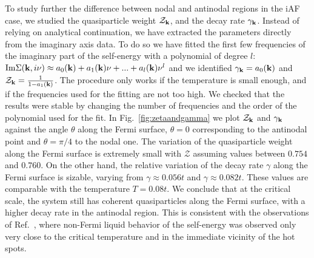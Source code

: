 To study further the difference between nodal and antinodal regions in the iAF case, we studied the quasiparticle weight\cite{Abrikosov1963,Metzner2012} $\mathcal{Z}_{\mathbf{k}}$, and the decay rate $\gamma_{\mathbf{k}}$.
Instead of relying on analytical continuation, we have extracted the parameters directly from the imaginary axis data.
To do so we have fitted the first few frequencies of the imaginary part of the self-energy with a polynomial of degree $l$: $\mathrm{Im}\Sigma(\mathbf{k},i\nu)\approx a_0(\mathbf{k})+a_1(\mathbf{k})\nu+...+a_l(\mathbf{k})\nu^l$ and we identified $\gamma_{\mathbf{k}}=a_0(\mathbf{k})$ and $\mathcal{Z}_{\mathbf{k}}= \frac{1}{1-a_1(\mathbf{k})}$.
The procedure only works if the temperature is small enough, and if the frequencies used for the fitting are not too high. We checked that the results were stable by changing the number of frequencies and the order of the polynomial used for the fit. 
In Fig.~\ref{fig:zetaandgamma} we plot $\mathcal{Z}_{\mathbf{k}}$ and $\gamma_{\mathbf{k}}$ against the angle $\theta$ along the Fermi surface, $\theta=0$ corresponding to the antinodal point and $\theta=\pi/4$ to the nodal one. 
The variation of the quasiparticle weight along the Fermi surface is extremely small with $\mathcal{Z}$ assuming values between $0.754$ and $0.760$. 
On the other hand, the relative variation of the decay rate $\gamma$ along the Fermi surface is sizable, varying from $\gamma\approx 0.056t$ and $\gamma \approx 0.082t$. These values are comparable with the temperature $T=0.08t$. 
We conclude that at the critical scale, the system still has coherent quasiparticles along the Fermi surface, with a higher decay rate in the antinodal region. This is consistent with the observations of Ref.~\cite{Rohe2005}, where non-Fermi liquid behavior of the self-energy was observed only very close to the critical temperature and in the immediate vicinity of the hot spots.%




